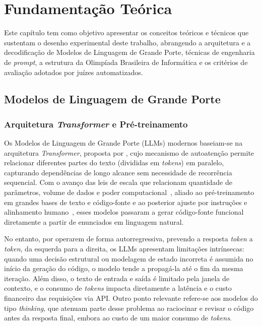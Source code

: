 \chapter{Fundamentação Teórica}\label{cap:fundamentacao}

Este capítulo tem como objetivo apresentar os conceitos teóricos e técnicos que sustentam o desenho experimental deste trabalho, abrangendo a arquitetura e a decodificação de Modelos de Linguagem de Grande Porte, técnicas de engenharia de \textit{prompt}, a estrutura da Olimpíada Brasileira de Informática e os critérios de avaliação adotados por juízes automatizados.

\section{Modelos de Linguagem de Grande Porte}\label{sec:fund-llms}

\subsection{Arquitetura \textit{Transformer} e Pré-treinamento}\label{sec:fund-transformer}

Os Modelos de Linguagem de Grande Porte (LLMs) modernos baseiam-se na arquitetura \textit{Transformer}, proposta por \citet{vaswani2017}, cujo mecanismo de autoatenção permite relacionar diferentes partes do texto (divididas em \textit{tokens}) em paralelo, capturando dependências de longo alcance sem necessidade de recorrência sequencial. Com o avanço das leis de escala que relacionam quantidade de parâmetros, volume de dados e poder computacional~\citep{kaplan2020scaling}, aliado ao pré-treinamento em grandes bases de texto e código-fonte e ao posterior ajuste por instruções e alinhamento humano~\citep{ouyang2022,wei2021finetuned,touvron2023llama}, esses modelos passaram a gerar código-fonte funcional diretamente a partir de enunciados em linguagem natural.

No entanto, por operarem de forma autorregressiva, prevendo a resposta \textit{token} a \textit{token}, da esquerda para a direita, os LLMs apresentam limitações intrínsecas: quando uma decisão estrutural ou modelagem de estado incorreta é assumida no início da geração do código, o modelo tende a propagá-la até o fim da mesma iteração. Além disso, o texto de entrada e saída é limitado pela janela de contexto, e o consumo de \textit{tokens} impacta diretamente a latência e o custo financeiro das requisições via API. Outro ponto relevante refere-se aos modelos do tipo \textit{thinking}, que atenuam parte desse problema ao raciocinar e revisar o código antes da resposta final, embora ao custo de um maior consumo de \textit{tokens}.

